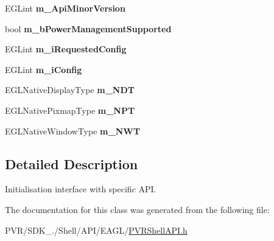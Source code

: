 \begin{DoxyCompactItemize}
\item 
\hypertarget{class_p_v_r_shell_init_a_p_i_a1f5712693304473907c4c1f6dfd736f7}{E\+G\+Lint {\bfseries m\+\_\+\+Api\+Minor\+Version}}\label{class_p_v_r_shell_init_a_p_i_a1f5712693304473907c4c1f6dfd736f7}

\item 
\hypertarget{class_p_v_r_shell_init_a_p_i_a02022a9072581b92833373d2d0fee6da}{bool {\bfseries m\+\_\+b\+Power\+Management\+Supported}}\label{class_p_v_r_shell_init_a_p_i_a02022a9072581b92833373d2d0fee6da}

\item 
\hypertarget{class_p_v_r_shell_init_a_p_i_ab747daa49ddee02784dc616ccb2993db}{E\+G\+Lint {\bfseries m\+\_\+i\+Requested\+Config}}\label{class_p_v_r_shell_init_a_p_i_ab747daa49ddee02784dc616ccb2993db}

\item 
\hypertarget{class_p_v_r_shell_init_a_p_i_a182efacb6ad70b7f0467bec56e38732f}{E\+G\+Lint {\bfseries m\+\_\+i\+Config}}\label{class_p_v_r_shell_init_a_p_i_a182efacb6ad70b7f0467bec56e38732f}

\item 
\hypertarget{class_p_v_r_shell_init_a_p_i_ae6ea9e7bdc6b8b1c311da1280510e39b}{E\+G\+L\+Native\+Display\+Type {\bfseries m\+\_\+\+N\+D\+T}}\label{class_p_v_r_shell_init_a_p_i_ae6ea9e7bdc6b8b1c311da1280510e39b}

\item 
\hypertarget{class_p_v_r_shell_init_a_p_i_ac8a0652252aa7c65b4ee41669ff19a68}{E\+G\+L\+Native\+Pixmap\+Type {\bfseries m\+\_\+\+N\+P\+T}}\label{class_p_v_r_shell_init_a_p_i_ac8a0652252aa7c65b4ee41669ff19a68}

\item 
\hypertarget{class_p_v_r_shell_init_a_p_i_a8d1933df5020d77003ab1a23e4785f1a}{E\+G\+L\+Native\+Window\+Type {\bfseries m\+\_\+\+N\+W\+T}}\label{class_p_v_r_shell_init_a_p_i_a8d1933df5020d77003ab1a23e4785f1a}

\end{DoxyCompactItemize}


\subsection{Detailed Description}
Initialisation interface with specific A\+P\+I. 



 

The documentation for this class was generated from the following file\+:\begin{DoxyCompactItemize}
\item 
P\+V\+R/\+S\+D\+K\+\_./\+Shell/\+A\+P\+I/\+E\+A\+G\+L/\hyperlink{_e_a_g_l_2_p_v_r_shell_a_p_i_8h}{P\+V\+R\+Shell\+A\+P\+I.\+h}\end{DoxyCompactItemize}
